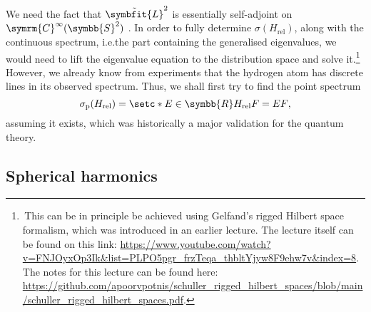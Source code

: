 \documentclass[12pt, a4 paper]{article}
\theoremstyle{definition}
\newcommand{\rr}{\symbb{R}}
\newcommand{\spec}{\sigma}
\newcommand{\lvecsquare}{\tilde{\symbfit{L}}^2}
\begin{document}
    We need the fact that $\lvecsquare$ is essentially self-adjoint on $\symrm{C}^\infty(\symbb{S}^2)$ \cite{MorettiDomain}. In order to fully determine $\spec(H_\text{rel})$, along with the continuous spectrum, i.e.\@ the part containing the generalised eigenvalues, we would need to lift the eigenvalue equation to the distribution space and solve it.\footnote{\,This can be in principle be achieved using Gelfand's rigged Hilbert space formalism, which was introduced in an earlier lecture. The lecture itself can be found on this link: \url{https://www.youtube.com/watch?v=FNJOyxOp3Ik&list=PLPO5pgr_frzTeqa_thbltYjyw8F9ehw7v&index=8}. The notes for this lecture can be found here: \url{https://github.com/apoorvpotnis/schuller_rigged_hilbert_spaces/blob/main/schuller_rigged_hilbert_spaces.pdf}.} However, we already know from experiments that the hydrogen atom has discrete lines in its observed spectrum. Thus, we shall first try to find the point spectrum
    \[
        \spec_{\text{p}}(H_\text{rel}) = \setc*{E \in \rr}{H_\text{rel} F = E F},
    \]
    assuming it exists, which was historically a major validation for the quantum theory.

    \subsection{Spherical harmonics}
\end{document}
